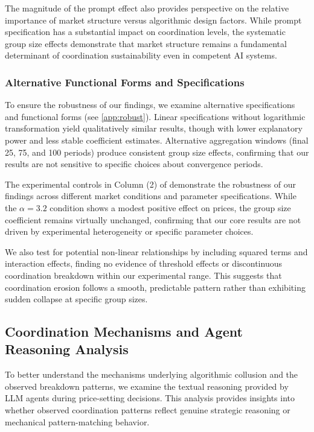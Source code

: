 The magnitude of the prompt effect also provides perspective on the relative importance of market structure versus algorithmic design factors. While prompt specification has a substantial impact on coordination levels, the systematic group size effects demonstrate that market structure remains a fundamental determinant of coordination sustainability even in competent AI systems.

\subsubsection*{Alternative Functional Forms and Specifications}

To ensure the robustness of our findings, we examine alternative specifications and functional forms (see \ref{app:robust}). Linear specifications without logarithmic transformation yield qualitatively similar results, though with lower explanatory power and less stable coefficient estimates. Alternative aggregation windows (final 25, 75, and 100 periods) produce consistent group size effects, confirming that our results are not sensitive to specific choices about convergence periods.

The experimental controls in Column (2) of  demonstrate the robustness of our findings across different market conditions and parameter specifications. While the $\alpha = 3.2$ condition shows a modest positive effect on prices, the group size coefficient remains virtually unchanged, confirming that our core results are not driven by experimental heterogeneity or specific parameter choices.

We also test for potential non-linear relationships by including squared terms and interaction effects, finding no evidence of threshold effects or discontinuous coordination breakdown within our experimental range. This suggests that coordination erosion follows a smooth, predictable pattern rather than exhibiting sudden collapse at specific group sizes.

\subsection{Coordination Mechanisms and Agent Reasoning Analysis}

To better understand the mechanisms underlying algorithmic collusion and the observed breakdown patterns, we examine the textual reasoning provided by LLM agents during price-setting decisions. This analysis provides insights into whether observed coordination patterns reflect genuine strategic reasoning or mechanical pattern-matching behavior.



